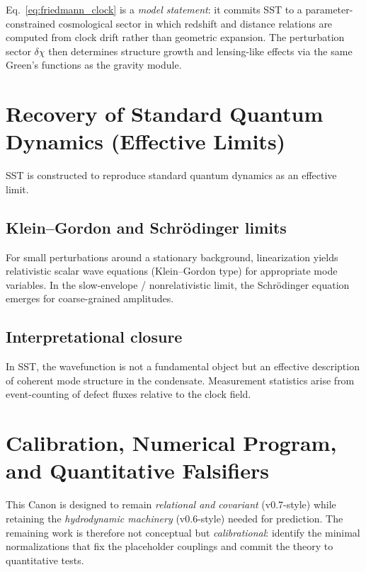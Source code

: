 \documentclass[10pt]{article}
\begin{document}
Eq.~\eqref{eq:friedmann_clock} is a \emph{model statement}: it commits SST to a
parameter-constrained cosmological sector in which redshift and distance relations
are computed from clock drift rather than geometric expansion. The perturbation
sector $\delta\chi$ then determines structure growth and lensing-like effects via
the same Green's functions as the gravity module.


\section{Recovery of Standard Quantum Dynamics (Effective Limits)}
    \label{sec:qm_limits}

    SST is constructed to reproduce standard quantum dynamics as an effective limit.

    \subsection{Klein--Gordon and Schr\"odinger limits}

        For small perturbations around a stationary background, linearization yields
        relativistic scalar wave equations (Klein--Gordon type) for appropriate mode
        variables. In the slow-envelope / nonrelativistic limit, the Schr\"odinger
        equation emerges for coarse-grained amplitudes.

    \subsection{Interpretational closure}

        In SST, the wavefunction is not a fundamental object but an effective
        description of coherent mode structure in the condensate. Measurement
        statistics arise from event-counting of defect fluxes relative to the
        clock field.


    \section{Calibration, Numerical Program, and Quantitative Falsifiers}
    \label{sec:calibration_program}

This Canon is designed to remain \emph{relational and covariant} (v0.7-style) while
retaining the \emph{hydrodynamic machinery} (v0.6-style) needed for prediction.
The remaining work is therefore not conceptual but \emph{calibrational}: identify
the minimal normalizations that fix the placeholder couplings and commit the theory
to quantitative tests.
\end{document}
